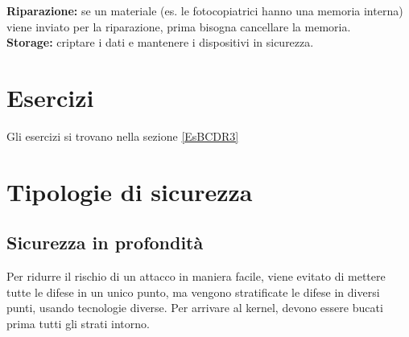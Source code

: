 \textbf{Riparazione:} se un materiale (es. le fotocopiatrici hanno una memoria 
interna) viene inviato per la riparazione, prima bisogna cancellare la memoria.
\\
\newline
\textbf{Storage:} criptare i dati e mantenere i dispositivi in sicurezza.

\section{Esercizi}

Gli esercizi si trovano nella sezione \ref{EsBCDR3}

\section{Tipologie di sicurezza}

\subsection{Sicurezza in profondità}

Per ridurre il rischio di un attacco in maniera facile, viene evitato di
mettere tutte le difese in un unico punto, ma vengono stratificate le difese in
diversi punti, usando tecnologie diverse.
Per arrivare al kernel, devono essere bucati prima tutti gli strati intorno.

